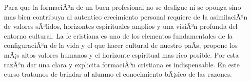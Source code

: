 \begin{syllabus}


\begin{justification}
Para que la formaciÃ³n de un buen profesional no se desligue ni se oponga sino mas bien contribuya al autentico crecimiento personal requiere de la asimilaciÃ³n de valores sÃ³lidos, horizontes espirituales amplios y una visiÃ³n profunda del entorno cultural. La fe cristiana es uno de los elementos fundamentales de la configuraciÃ³n de la vida y el que hacer cultural de nuestro paÃ­s, propone los mÃ¡s altos valores humanos y el horizonte espiritual mas rico posible.
Por esta razÃ³n dar una clara y explicita formaciÃ³n cristiana es indispensable.  En este curso tratamos de brindar al alumno el conocimiento bÃ¡sico de las razones.
\end{justification}

\begin{goals}
\item \OutcomeFH
\end{goals}

\begin{outcomes}
\end{outcomes}


\end{syllabus}
